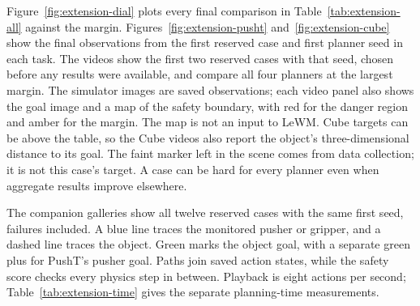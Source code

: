 Figure~\ref{fig:extension-dial} plots every final comparison in
Table~\ref{tab:extension-all} against the margin.
Figures~\ref{fig:extension-pusht} and~\ref{fig:extension-cube} show the
final observations from the first reserved case and first planner seed in
each task. The videos show the first two reserved cases with that seed,
chosen before any results were available, and compare all four planners at
the largest margin. The simulator images are saved observations; each video
panel also shows the goal image and a map of the safety boundary, with red
for the danger region and amber for the margin. The map is not an input to
LeWM. Cube targets can be above the table, so the Cube videos also report
the object's three-dimensional distance to its goal. The faint marker left
in the scene comes from data collection; it is not this case's target. A
case can be hard for every planner even when aggregate results improve
elsewhere.

The companion galleries show all twelve reserved cases with the same first
seed, failures included. A blue line traces the monitored pusher or
gripper, and a dashed line traces the object. Green marks the object goal,
with a separate green plus for PushT's pusher goal. Paths join saved action
states, while the safety score checks every physics step in between.
Playback is eight actions per second; Table~\ref{tab:extension-time} gives
the separate planning-time measurements.

